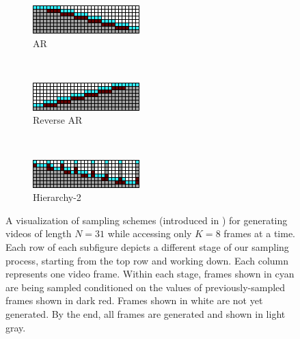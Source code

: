 \begin{figure}[t]
    \centering
    \begin{subfigure}[t]{0.3\textwidth}
        \centering
        \includegraphics[width=\textwidth]{figures/sampling-scheme-visualizations/autoreg.png}
        \caption{AR}
        \label{fig:ar}
    \end{subfigure}
    ~
    \begin{subfigure}[t]{0.3\textwidth}
        \centering
        \includegraphics[width=\textwidth]{figures/sampling-scheme-visualizations/reverse-autoreg.png}
        \caption{Reverse AR}
        \label{fig:rev_ar}
    \end{subfigure}
    ~
    \begin{subfigure}[t]{0.3\textwidth}
        \centering
        \includegraphics[width=\textwidth]{figures/sampling-scheme-visualizations/hierarchy-2.png}
        \caption{Hierarchy-2}
        \label{fig:h2}
    \end{subfigure}
    \caption[A visualization of sampling schemes introduced in prior work.]{A visualization of sampling schemes (introduced in \citet{fdm}) for generating videos of length $N=31$ while accessing only $K=8$ frames at a time. Each row of each subfigure depicts a different stage of our sampling process, starting from the top row and working down. Each column represents one video frame. Within each stage, frames shown in cyan are being sampled conditioned on the values of previously-sampled frames shown in dark red. Frames shown in white are not yet generated. By the end, all frames are generated and shown in light gray.
    }
    \label{fig:old-sampling-schemes}
\end{figure}







